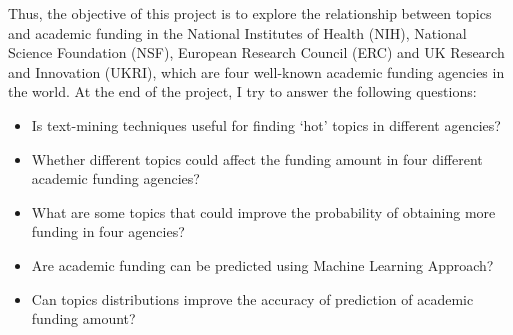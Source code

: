 Thus, the objective of this project is to explore the relationship between topics and academic funding in the National Institutes of Health (NIH), National Science Foundation (NSF), European Research Council (ERC) and UK Research and Innovation (UKRI), which are four well-known academic funding agencies in the world. At the end of the project, I try to answer the following questions:

\begin{itemize}
    \item Is text-mining techniques useful for finding `hot' topics in different agencies?
    \item Whether different topics could affect the funding amount in four different academic funding agencies?
    \item What are some topics that could improve the probability of obtaining more funding in four agencies?
    \item Are academic funding can be predicted using Machine Learning Approach?
    \item Can topics distributions improve the accuracy of prediction of academic funding amount?
\end{itemize}
